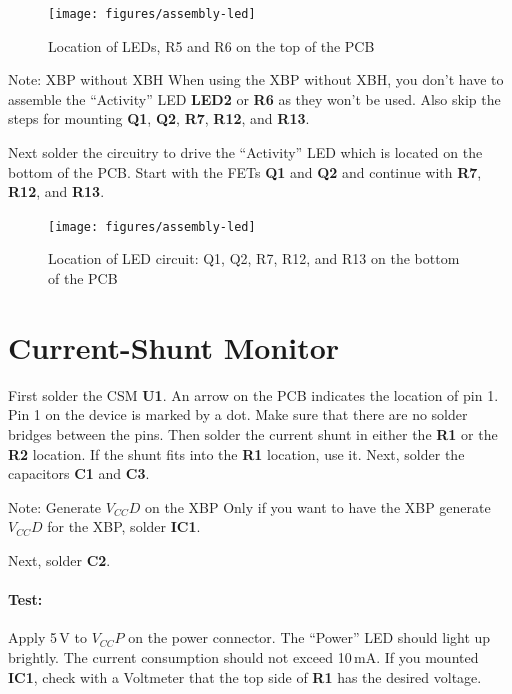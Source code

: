 \documentclass[twoside,11pt]{cergdoc}
\begin{document}
\begin{figure}[ht]
  \begin{center}
    \texttt{[image: figures/assembly-led]}
    \caption{Location of LEDs, R5 and R6 on the top of the PCB}
  \end{center}
\end{figure}

\begin{cergbox}{Note: XBP without XBH}
    When using the XBP without XBH, you don't have to assemble the 
    ``Activity'' LED \textbf{LED2} or \textbf{R6} as they won't be used.
    Also skip the steps for mounting \textbf{Q1}, \textbf{Q2}, \textbf{R7},
    \textbf{R12}, and \textbf{R13}.
\end{cergbox}

\noindent Next solder the circuitry to drive the ``Activity'' LED which is located
on the bottom of the PCB. Start with the FETs \textbf{Q1} and \textbf{Q2}
and continue with \textbf{R7}, \textbf{R12}, and \textbf{R13}.

\begin{figure}[ht]
  \begin{center}
    \texttt{[image: figures/assembly-led]}
    \caption{Location of LED circuit: Q1, Q2, R7, R12, and R13 on the bottom of the PCB}
  \end{center}
\end{figure}

\section{Current-Shunt Monitor}
First solder the CSM \textbf{U1}. 
An arrow on the PCB indicates the location of pin 1. Pin 1 on the device 
is marked by a dot. Make sure that there are no solder bridges between the
pins. Then solder the current shunt in either the \textbf{R1} or the
\textbf{R2} location. If the shunt fits into the \textbf{R1} location, use it.
Next, solder the capacitors \textbf{C1} and \textbf{C3}.

\begin{cergbox}{Note: Generate $V_{CC}D$ on the XBP}
Only if you want to have the XBP generate $V_{CC}D$ for the XBP, solder \textbf{IC1}.
\end{cergbox}

\noindent Next, solder \textbf{C2}.

\paragraph{Test:} Apply 5\,V to $V_{CC}P$ on the power connector. The ``Power''
LED should light up brightly. The current consumption should not exceed 
10\,mA. If you mounted \textbf{IC1}, check with a Voltmeter that the top side
of \textbf{R1} has the desired voltage.
\end{document}
